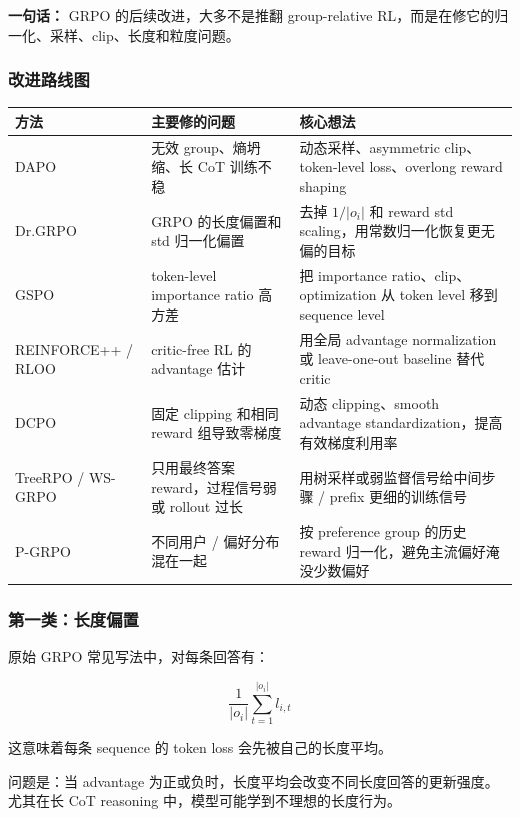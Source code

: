 \begin{summarybox}
\textbf{一句话：} GRPO 的后续改进，大多不是推翻 group-relative RL，而是在修它的归一化、采样、clip、长度和粒度问题。
\end{summarybox}

\subsubsection{改进路线图}

\begin{center}
{\small
\begin{tabular}{p{2.6cm}p{4.4cm}p{5.8cm}}
\hline
\textbf{方法} & \textbf{主要修的问题} & \textbf{核心想法} \\
\hline
DAPO
&
无效 group、熵坍缩、长 CoT 训练不稳
&
动态采样、asymmetric clip、token-level loss、overlong reward shaping
\\
Dr.GRPO
&
GRPO 的长度偏置和 std 归一化偏置
&
去掉 $1/|o_i|$ 和 reward std scaling，用常数归一化恢复更无偏的目标
\\
GSPO
&
token-level importance ratio 高方差
&
把 importance ratio、clip、optimization 从 token level 移到 sequence level
\\
REINFORCE++ / RLOO
&
critic-free RL 的 advantage 估计
&
用全局 advantage normalization 或 leave-one-out baseline 替代 critic
\\
DCPO
&
固定 clipping 和相同 reward 组导致零梯度
&
动态 clipping、smooth advantage standardization，提高有效梯度利用率
\\
TreeRPO / WS-GRPO
&
只用最终答案 reward，过程信号弱或 rollout 过长
&
用树采样或弱监督信号给中间步骤 / prefix 更细的训练信号
\\
P-GRPO
&
不同用户 / 偏好分布混在一起
&
按 preference group 的历史 reward 归一化，避免主流偏好淹没少数偏好
\\
\hline
\end{tabular}
}
\end{center}

\subsubsection{第一类：长度偏置}

原始 GRPO 常见写法中，对每条回答有：

\[
\frac{1}{|o_i|}
\sum_{t=1}^{|o_i|}
l_{i,t}
\]

这意味着每条 sequence 的 token loss 会先被自己的长度平均。

问题是：当 advantage 为正或负时，长度平均会改变不同长度回答的更新强度。尤其在长 CoT reasoning 中，模型可能学到不理想的长度行为。

